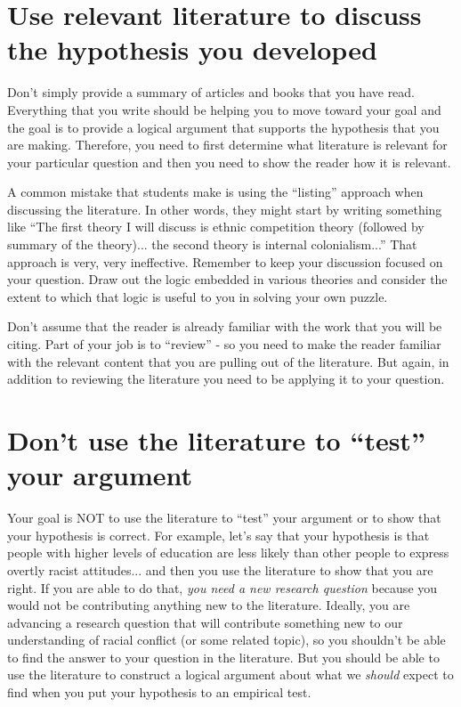 \documentclass[12pt]{article}
\begin{document}
\section{{\textbf{Use relevant literature to discuss the hypothesis you developed}}}
\begin{singlespace}
Don't simply provide a summary of articles and books that you have read. Everything that you write should be helping you to move toward your goal and the goal is to provide a logical argument that supports the hypothesis that you are making. Therefore, you need to first determine what literature is relevant for your particular question and then you need to show the reader how it is relevant.

A common mistake that students make is using the ``listing'' approach when discussing the literature. In other words, they might start by writing something like ``The first theory I will discuss is ethnic competition theory (followed by summary of the theory)... the second theory is internal colonialism...'' That approach is very, very ineffective. Remember to keep your discussion focused on your question. Draw out the logic embedded in various theories and consider the extent to which that logic is useful to you in solving your own puzzle.

Don't assume that the reader is already familiar with the work that you will be citing. Part of your job is to ``review'' - so you need to make the reader familiar with the relevant content that you are pulling out of the literature. But again, in addition to reviewing the literature you need to be applying it to your question.
\end{singlespace}


\section{{\textbf{Don't use the literature to ``test'' your argument}}}
\begin{singlespace}
Your goal is NOT to use the literature to ``test'' your argument or to show that your hypothesis is correct. For example, let's say that your hypothesis is that people with higher levels of education are less likely than other people to express overtly racist attitudes... and then you use the literature to show that you are right. If you are able to do that, {\it{you need a new research question}} because you would not be contributing anything new to the literature. Ideally, you are advancing a research question that will contribute something new to our understanding of racial conflict (or some related topic), so you shouldn't be able to find the answer to your question in the literature. But you should be able to use the literature to construct a logical argument about what we {\it{should}} expect to find when you put your hypothesis to an empirical test.
\end{singlespace}
\end{document}
